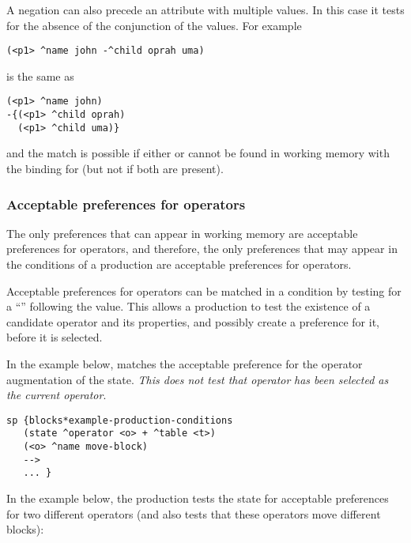 A negation can also precede an attribute with multiple values.  In this case it tests for the absence of the conjunction of the values.  For example

\begin{verbatim}
(<p1> ^name john -^child oprah uma)
\end{verbatim}

is the same as 

\begin{verbatim}
(<p1> ^name john)
-{(<p1> ^child oprah)
  (<p1> ^child uma)}
\end{verbatim}

and the match is possible if either  or  cannot be found in working memory with the binding for  (but not if both are present).

\subsubsection{Acceptable preferences for operators}
\label{SYNTAX-pm-lhs-acceptable}
\index{+}

The only preferences that can appear in working memory are acceptable preferences for operators, and therefore, the only preferences that may appear in the conditions of a production are acceptable preferences for operators.

Acceptable preferences for operators can be matched in a condition by testing for a ``\soar{+}'' following the value.  This allows a production to test the existence of a candidate operator and its properties, and possibly create a preference for it, before it is selected.

In the example below,  matches the acceptable preference for the operator augmentation of the state. \emph{This does not test that operator}  \emph{has been selected as the current operator}.

\begin{verbatim}
sp {blocks*example-production-conditions
   (state ^operator <o> + ^table <t>)
   (<o> ^name move-block)
   -->
   ... }
\end{verbatim}


In the example below, the production tests the state for acceptable preferences for two different operators (and also tests that these operators move different blocks):


